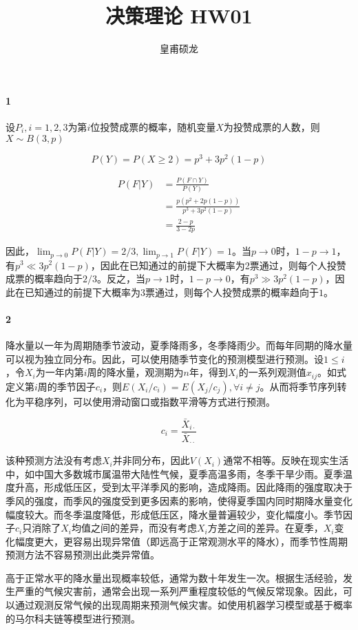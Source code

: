 \documentclass[UTF8]{ctexart}
\title{决策理论 HW01}
\author{皇甫硕龙}
\begin{document}
    \maketitle

    \paragraph*{1}

    设$P_i, i=1, 2, 3$为第$i$位投赞成票的概率，随机变量$X$为投赞成票的人数，则$X\sim B(3, p)$

    \begin{equation}
        P(Y) = P(X\geq 2) = p^3 +  3p^2(1 - p)
    \end{equation}

    \begin{equation}
        \begin{aligned}
            P(F|Y) &= \frac{P(F\cap Y)}{P(Y)} \\
            &= \frac{p(p^2 + 2p(1-p))}{p^3 +  3p^2(1 - p)} \\
            &= \frac{2-p}{3-2p}
        \end{aligned}
    \end{equation}

    因此，$\lim_{p\rightarrow 0} P(F|Y) = 2/3, \lim_{p\rightarrow 1} P(F|Y) = 1$。当$p\rightarrow 0$时，$1-p\rightarrow 1$，有$p^3\ll 3p^2(1-p)$，因此在已知通过的前提下大概率为2票通过，则每个人投赞成票的概率趋向于$2/3$。反之，当$p\rightarrow 1$时，$1-p\rightarrow 0$，有$p^3\gg 3p^2(1-p)$，因此在已知通过的前提下大概率为3票通过，则每个人投赞成票的概率趋向于$1$。

    \paragraph*{2} 降水量以一年为周期随季节波动，夏季降雨多，冬季降雨少。而每年同期的降水量可以视为独立同分布。因此，可以使用随季节变化的预测模型进行预测。设$1\leq i$，令$X_i$为一年内第$i$周的降水量，观测期为$n$年，得到$X_i$的一系列观测值$x_{ij}$。如式定义第$i$周的季节因子$c_i$，则$E(X_i/c_i) = E(X_j/c_j), \forall i\not = j$。从而将季节序列转化为平稳序列，可以使用滑动窗口或指数平滑等方式进行预测。

    \begin{equation}
        c_i = \frac{\bar{X}_{i\cdot}}{\bar{X}_{\cdot\cdot}}
        \label{eq:1}
    \end{equation}
    
    该种预测方法没有考虑$X_i$并非同分布，因此$V(X_i)$通常不相等。反映在现实生活中，如中国大多数城市属温带大陆性气候，夏季高温多雨，冬季干旱少雨。夏季温度升高，形成低压区，受到太平洋季风的影响，造成降雨。因此降雨的强度取决于季风的强度，而季风的强度受到更多因素的影响，使得夏季国内同时期降水量变化幅度较大。而冬季温度降低，形成低压区，降水量普遍较少，变化幅度小。季节因子$c_i$只消除了$X_i$均值之间的差异，而没有考虑$X_i$方差之间的差异。在夏季，$X_i$变化幅度更大，更容易出现异常值（即远高于正常观测水平的降水），而季节性周期预测方法不容易预测出此类异常值。

    高于正常水平的降水量出现概率较低，通常为数十年发生一次。根据生活经验，发生严重的气候灾害前，通常会出现一系列严重程度较低的气候反常现象。因此，可以通过观测反常气候的出现周期来预测气候灾害。如使用机器学习模型或基于概率的马尔科夫链等模型进行预测。
\end{document}
